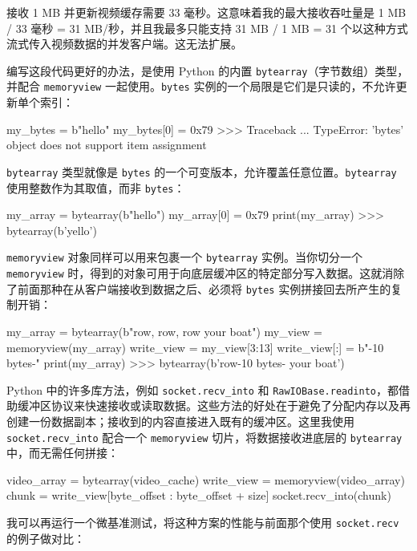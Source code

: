 接收 1 MB 并更新视频缓存需要 33 毫秒。这意味着我的最大接收吞吐量是 1 MB / 33 毫秒 = 31 MB/秒，并且我最多只能支持 31 MB / 1 MB = 31 个以这种方式流式传入视频数据的并发客户端。这无法扩展。

编写这段代码更好的办法，是使用 Python 的内置 \texttt{bytearray}（字节数组）类型，并配合 \texttt{memoryview} 一起使用。\texttt{bytes} 实例的一个局限是它们是只读的，不允许更新单个索引：

\begin{codebox}[python]
my_bytes = b"hello"
my_bytes[0] = 0x79
>>>
Traceback ...
TypeError: 'bytes' object does not support item assignment
\end{codebox}

\texttt{bytearray} 类型就像是 \texttt{bytes} 的一个可变版本，允许覆盖任意位置。\texttt{bytearray} 使用整数作为其取值，而非 \texttt{bytes}：

\begin{codebox}[python]
my_array = bytearray(b"hello")
my_array[0] = 0x79
print(my_array)
>>>
bytearray(b'yello')
\end{codebox}

\texttt{memoryview} 对象同样可以用来包裹一个 \texttt{bytearray} 实例。当你切分一个 \texttt{memoryview} 时，得到的对象可用于向底层缓冲区的特定部分写入数据。这就消除了前面那种在从客户端接收到数据之后、必须将 \texttt{bytes} 实例拼接回去所产生的复制开销：

\begin{codebox}[python]
my_array = bytearray(b"row, row, row your boat")
my_view = memoryview(my_array)
write_view = my_view[3:13]
write_view[:] = b"-10 bytes-"
print(my_array)
>>>
bytearray(b'row-10 bytes- your boat')
\end{codebox}

Python 中的许多库方法，例如 \texttt{socket.recv\_into} 和 \texttt{RawIOBase.readinto}，都借助缓冲区协议来快速接收或读取数据。这些方法的好处在于避免了分配内存以及再创建一份数据副本；接收到的内容直接进入既有的缓冲区。这里我使用 \texttt{socket.recv\_into} 配合一个 \texttt{memoryview} 切片，将数据接收进底层的 \texttt{bytearray} 中，而无需任何拼接：

\begin{codebox}[python]
video_array = bytearray(video_cache)
write_view = memoryview(video_array)
chunk = write_view[byte_offset : byte_offset + size]
socket.recv_into(chunk)
\end{codebox}

我可以再运行一个微基准测试，将这种方案的性能与前面那个使用 \texttt{socket.recv} 的例子做对比：

